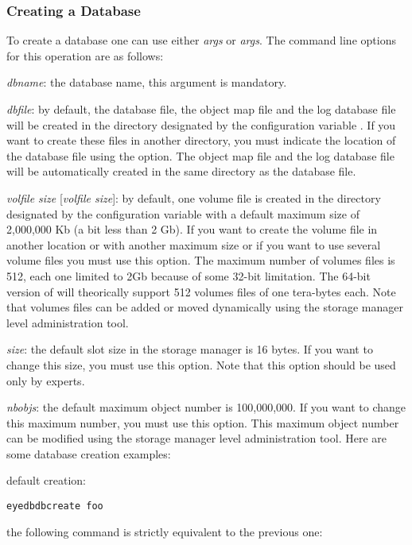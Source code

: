 \subsubsection{Creating a Database}
To create a database one can use either  \emph{args}
or  \emph{args}.
The command line options for this operation are as follows:
\bi
\item \emph{dbname}: the database name, this argument is mandatory.
\item {} \emph{dbfile}: by default, the database file,
the object map
file and the log database file will be created in the directory designated
by the configuration variable . If you want to create these
files in another directory, you must indicate the location of the
database file using the  option. The object map file
and the log database file will be automatically created in the
same directory as the database file.
\item {} \emph{volfile size} [\emph{volfile size}]: by default,
one volume file is created in the directory designated by the
configuration variable  with a default maximum size of
2,000,000 Kb (a bit less than 2 Gb). If you want to create the volume
file in another location or with another maximum size or if you want
to use several volume files you must use this option.
The maximum number of volumes files is 512, each one limited to 2Gb because
of some 32-bit limitation. The 64-bit version of \eyedb will theorically
support 512 volumes files of one tera-bytes each.
Note that volumes files can be added or moved dynamically using the
 storage manager level administration tool.
\item {} \emph{size}: the default slot size in the storage
manager is 16 bytes. If you want to change this size, you must use this option.
Note that this option should be used only by experts.
\item {} \emph{nbobjs}: the default maximum object number is
100,000,000. If you want to change this maximum number, you must use
this option. This maximum object number can be modified using the
 storage manager level administration tool.
\ei
Here are some database creation examples:
\bi
\item default creation:
\verbsize
\begin{verbatim}
eyedbdbcreate foo
\end{verbatim}
\normalsize
\item the following command is strictly equivalent to the previous one:
